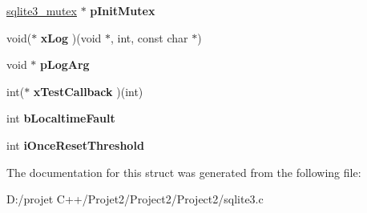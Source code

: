 \begin{DoxyCompactItemize}
\mbox{\hyperlink{structsqlite3__mutex}{sqlite3\+\_\+mutex}} $\ast$ {\bfseries p\+Init\+Mutex}
\item 
\mbox{\label{struct_sqlite3_config_a3d9750f6c4fc73fdce5f83357184faae}} 
void($\ast$ {\bfseries x\+Log} )(void $\ast$, int, const char $\ast$)
\item 
\mbox{\label{struct_sqlite3_config_a501ab4552bc7c54bb413aced5889dcdc}} 
void $\ast$ {\bfseries p\+Log\+Arg}
\item 
\mbox{\label{struct_sqlite3_config_a6d21468c424041f10eb0c251220088f6}} 
int($\ast$ {\bfseries x\+Test\+Callback} )(int)
\item 
\mbox{\label{struct_sqlite3_config_a7bdc3109ecd839317f722b5da5339fab}} 
int {\bfseries b\+Localtime\+Fault}
\item 
\mbox{\label{struct_sqlite3_config_aed7a7e3bd6862ff2ca1444e16ad3948f}} 
int {\bfseries i\+Once\+Reset\+Threshold}
\end{DoxyCompactItemize}


The documentation for this struct was generated from the following file\+:\begin{DoxyCompactItemize}
\item 
D\+:/projet C++/\+Projet2/\+Project2/\+Project2/sqlite3.\+c\end{DoxyCompactItemize}
